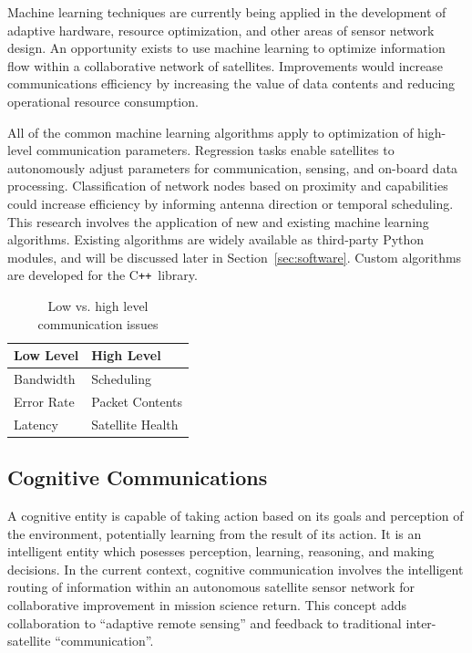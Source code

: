 \documentclass[conference]{IEEEtran}
\newcommand{\cpp}{C\texttt{++}~}
\begin{document}
Machine learning techniques are currently being applied in the development of
adaptive hardware, resource optimization, and other areas of sensor network
design.  An opportunity exists to use machine learning to optimize information
flow within a collaborative network of satellites.  Improvements would increase
communications efficiency by increasing the value of data contents and reducing
operational resource consumption.

All of the common machine learning algorithms apply to optimization of
high-level communication parameters.  Regression tasks enable satellites to
autonomously adjust parameters for communication, sensing, and on-board data
processing.  Classification of network nodes based on proximity and capabilities
could increase efficiency by informing antenna direction or temporal scheduling.
This research involves the application of new and existing machine learning
algorithms.  Existing algorithms are widely available as third-party Python
modules, and will be discussed later in Section~\ref{sec:software}.  Custom
algorithms are developed for the \cpp library.


\begin{table}[t]
  \caption{Low vs. high level communication issues}
  \begin{center}
    \begin{tabular}{|l|l|}
      \hline
      \textbf{Low Level} & \textbf{High Level}\\
      \hline
      Bandwidth & Scheduling\\
      \hline
      Error Rate & Packet Contents\\
      \hline
      Latency & Satellite Health\\
      \hline
    \end{tabular}
    \label{tab:comms}
  \end{center}
\end{table}

\subsection{Cognitive Communications}
\label{ssec:cognit}

A cognitive entity is capable of taking action based on its goals and perception
of the environment, potentially learning from the result of its action.  It is
an intelligent entity which posesses perception, learning, reasoning, and making
decisions.  In the current context, cognitive communication involves the
intelligent routing of information within an autonomous satellite sensor network
for collaborative improvement in mission science return.  This concept adds
collaboration to ``adaptive remote sensing'' and feedback to traditional
inter-satellite ``communication''.
\end{document}

